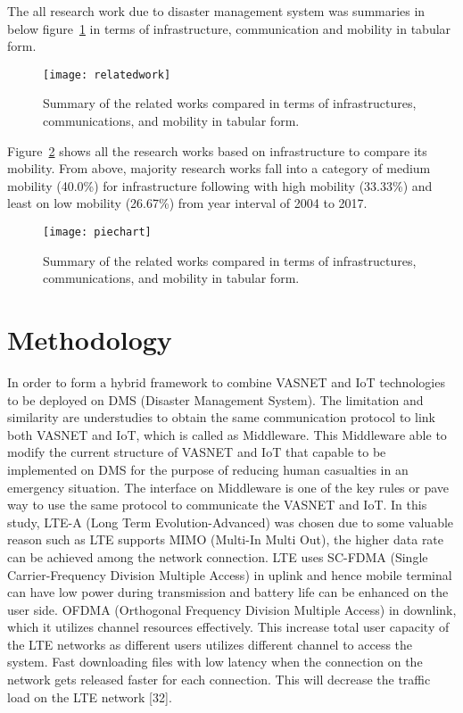 \documentclass{article}
\begin{document}
The all research work due to disaster management system was summaries in below figure~\ref{related-work} in terms of infrastructure, communication and mobility in tabular form.

\begin{center}
\begin{figure}
\texttt{[image: relatedwork]}
\caption{Summary of the related works compared in terms of infrastructures, communications, and mobility in tabular form.}
\label{related-work}
\end{figure}
\end{center}

\newpage
Figure~\ref{piechart} shows all the research works based on infrastructure to compare its mobility. From above, majority research works fall into a category of medium mobility (40.0\%) for infrastructure following with high mobility (33.33\%) and least on low mobility (26.67\%) from year interval of 2004 to 2017.

\begin{center}
\begin{figure}
\texttt{[image: piechart]}
\caption{Summary of the related works compared in terms of infrastructures, communications, and mobility in tabular form.}\label{piechart}
\end{figure}
\end{center}

\section{Methodology}

In order to form a hybrid framework to combine VASNET and IoT technologies to be deployed on DMS (Disaster Management System). The limitation and similarity are understudies to obtain the same communication protocol to link both VASNET and IoT, which is called as Middleware. This Middleware able to modify the current structure of VASNET and IoT that capable to be implemented on DMS for the purpose of reducing human casualties in an emergency situation. The interface on Middleware is one of the key rules or pave way to use the same protocol to communicate the VASNET and IoT. In this study, LTE-A (Long Term Evolution-Advanced) was chosen due to some valuable reason such as LTE supports MIMO (Multi-In Multi Out), the higher data rate can be achieved among the network connection. LTE uses SC-FDMA (Single Carrier-Frequency Division Multiple Access) in uplink and hence mobile terminal can have low power during transmission and battery life can be enhanced on the user side. OFDMA (Orthogonal Frequency Division Multiple Access) in downlink, which it utilizes channel resources effectively. This increase total user capacity of the LTE networks as different users utilizes different channel to access the system. Fast downloading files with low latency when the connection on the network gets released faster for each connection. This will decrease the traffic load on the LTE network [32]. 
\end{document}
